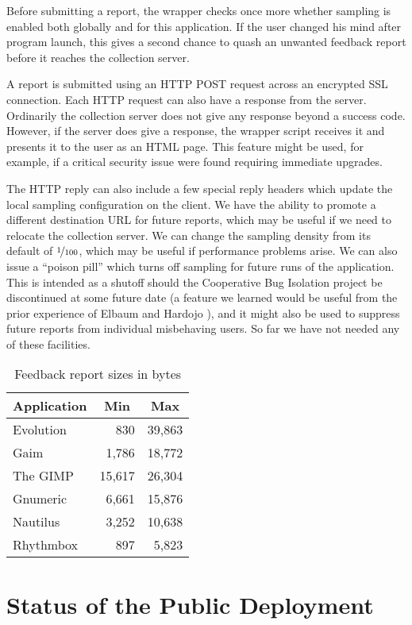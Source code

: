 \documentclass[10pt,twocolumn]{article}
\newcommand{\evolution}{Evolution\xspace}
\newcommand{\gaim}{Gaim\xspace}
\newcommand{\gimp}{The GIMP\xspace}
\newcommand{\gnumeric}{Gnumeric\xspace}
\newcommand{\nautilus}{Nautilus\xspace}
\newcommand{\rhythmbox}{Rhythmbox\xspace}
\newcommand{\header}[1]{\multicolumn{1}{c}{\textbf{#1}}}
\begin{document}
Before submitting a report, the wrapper checks once more whether
sampling is enabled both globally and for this application.  If the
user changed his mind after program launch, this gives a second chance
to quash an unwanted feedback report before it reaches the collection
server.

A report is submitted using an HTTP POST request across an encrypted SSL
connection.  Each HTTP request can also have a response from the server.
Ordinarily the collection server does not give any response beyond a
success code.  However, if the server does give a response, the
wrapper script receives it and presents it to the user as an HTML
page.  This feature might be used, for example, if a critical security
issue were found requiring immediate upgrades.  

The HTTP reply can also include a few special reply headers which
update the local sampling configuration on the client.  We have the
ability to promote a different destination URL for future reports,
which may be useful if we need to relocate the collection server.  We
can change the sampling density from its default of
$\nicefrac{1}{100}$, which may be useful if performance problems
arise.  We can also issue a ``poison pill'' which turns off sampling
for future runs of the application.  This is intended as a shutoff
should the Cooperative Bug Isolation project be discontinued at some
future date (a feature we learned would be useful from the prior
experience of Elbaum and Hardojo \cite{Elbaum:2003:DISATA}), and it
might also be used to suppress future reports from individual
misbehaving users.  So far we have not needed any of these facilities.

\begin{table}
  \centering
  \begin{tabular}{lrr}
    \header{Application} & \header{Min} & \header{Max} \\ \hline
    \evolution & 830 & 39,863  \\
    \gaim & 1,786 & 18,772  \\
    \gimp & 15,617 & 26,304  \\
    \gnumeric & 6,661 & 15,876  \\
    \nautilus & 3,252 & 10,638  \\
    \rhythmbox & 897 & 5,823 
  \end{tabular}
  \caption{Feedback report sizes in bytes}
  \label{report-sizes}
\end{table}

\section{Status of the Public Deployment}
\end{document}
